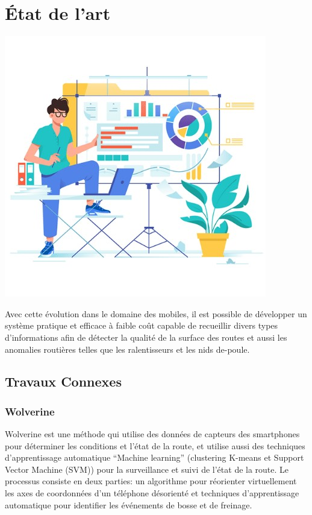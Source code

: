\chapter{État de l'art}

\label{chapitre3}
		
		\includegraphics [width=1 \linewidth, height=0.8\textheight, keepaspectratio] {Images/chapterFigures/chThree.jpg}
		
	
		
		\newpage

Avec cette évolution dans le domaine des mobiles, il est possible de développer un système pratique et efficace à faible coût capable de recueillir divers types d'informations afin de détecter la qualité de la surface des routes et aussi les anomalies routières telles
que les ralentisseurs et les nids de-poule.

\section{Travaux Connexes}
\label{tavauxconnexes}
\subsection{Wolverine}
Wolverine \cite{bhoraskarWolverineTrafficRoad2012} est une méthode qui utilise  des données de capteurs des smartphones pour déterminer les conditions et l'état de la route, et utilise aussi des techniques d'apprentissage automatique “Machine learning” (clustering K-means et Support Vector Machine (SVM)) pour la surveillance et suivi de l'état de la route. Le processus consiste en deux parties: un algorithme pour réorienter virtuellement les axes de coordonnées d'un téléphone désorienté  et techniques d'apprentissage automatique pour identifier les événements de bosse et de freinage.

